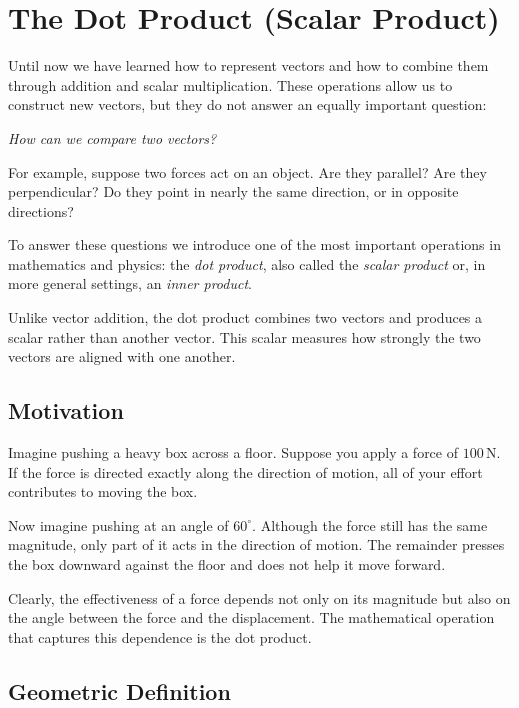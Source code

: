 \section{The Dot Product (Scalar Product)}
\label{sec:dot-product}

Until now we have learned how to represent vectors and how to combine them through
addition and scalar multiplication. These operations allow us to construct new
vectors, but they do not answer an equally important question:

\begin{center}
\emph{How can we compare two vectors?}
\end{center}

For example, suppose two forces act on an object. Are they parallel? Are they
perpendicular? Do they point in nearly the same direction, or in opposite
directions?

To answer these questions we introduce one of the most important operations in
mathematics and physics: the \emph{dot product}, also called the \emph{scalar
product} or, in more general settings, an \emph{inner product}.

Unlike vector addition, the dot product combines two vectors and produces a
scalar rather than another vector. This scalar measures how strongly the two
vectors are aligned with one another.

\subsection{Motivation}

Imagine pushing a heavy box across a floor. Suppose you apply a force of
$100\,\mathrm{N}$. If the force is directed exactly along the direction of
motion, all of your effort contributes to moving the box.

Now imagine pushing at an angle of $60^{\circ}$. Although the force still has
the same magnitude, only part of it acts in the direction of motion. The
remainder presses the box downward against the floor and does not help it move
forward.

Clearly, the effectiveness of a force depends not only on its magnitude but
also on the angle between the force and the displacement. The mathematical
operation that captures this dependence is the dot product.

\subsection{Geometric Definition}

